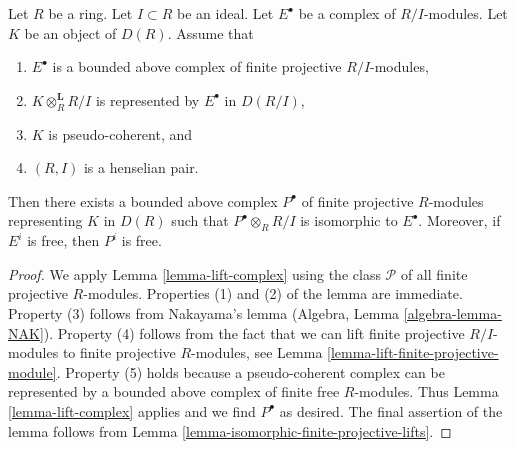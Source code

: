 \begin{lemma}
\label{lemma-lift-complex-finite-projectives}
Let $R$ be a ring. Let $I \subset R$ be an ideal. Let $E^\bullet$
be a complex of $R/I$-modules. Let $K$ be an object of $D(R)$. Assume that
\begin{enumerate}
\item $E^\bullet$ is a bounded above complex of finite projective $R/I$-modules,
\item $K \otimes_R^\mathbf{L} R/I$ is represented by $E^\bullet$ in $D(R/I)$,
\item $K$ is pseudo-coherent, and
\item $(R, I)$ is a henselian pair.
\end{enumerate}
Then there exists a bounded above complex $P^\bullet$ of finite projective
$R$-modules representing $K$ in $D(R)$ such that $P^\bullet \otimes_R R/I$
is isomorphic to $E^\bullet$. Moreover, if $E^i$ is free, then $P^i$ is free.
\end{lemma}

\begin{proof}
We apply Lemma \ref{lemma-lift-complex} using the class $\mathcal{P}$
of all finite projective $R$-modules. Properties (1) and (2)
of the lemma are immediate.
Property (3) follows from Nakayama's lemma
(Algebra, Lemma \ref{algebra-lemma-NAK}).
Property (4) follows from the fact that we can lift finite projective
$R/I$-modules to finite projective $R$-modules, see
Lemma \ref{lemma-lift-finite-projective-module}.
Property (5) holds because a pseudo-coherent complex can be represented
by a bounded above complex of finite free $R$-modules.
Thus Lemma \ref{lemma-lift-complex} applies and we find $P^\bullet$
as desired. The final assertion of the lemma follows from
Lemma \ref{lemma-isomorphic-finite-projective-lifts}.
\end{proof}
